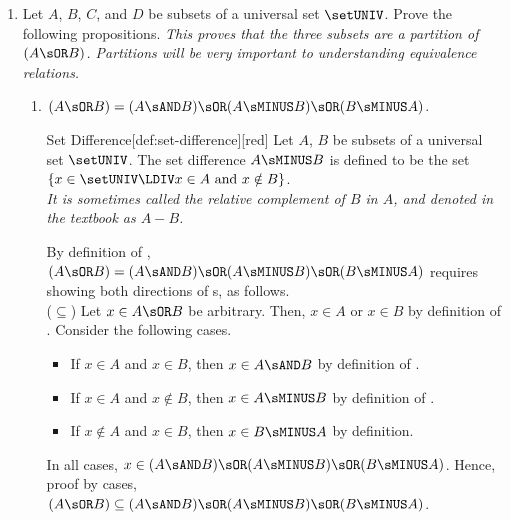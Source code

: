 \newpage
\begin{enumerate} 
  \newpage
  \item Let $A$, $B$, $C$, and $D$ be subsets of a universal set $\setUNIV$. 
  Prove the following propositions.
  \textit{This proves that the three subsets are a partition of 
  $(A \sOR B)$. Partitions will be very important to 
  understanding equivalence relations.}
  \begin{enumerate}
    \item $(A \sOR B)=(A \sAND B) \sOR(A \sMINUS B) \sOR(B \sMINUS A)$.\label{prob:partite-a}
    \begin{define}{Set Difference}[def:set-difference][red]
      Let $A$, $B$ be subsets of a universal set $\setUNIV$. The set difference $A \sMINUS B$ is defined to be the set $\{ x \in \setUNIV \LDIV x \in A \text{ and } x \notin B\}$. \vspace*{5px}\\
      \textit{It is sometimes called the relative complement of $B$ in $A$, and denoted in the textbook as $A - B$.}
    \end{define}
    \begin{subprove}
      By definition of , $(A \sOR B)=(A \sAND B) \sOR(A \sMINUS B) \sOR(B \sMINUS A)$ 
      requires showing both directions of s, as follows.\vspace*{5px}\\
      ($\subseteq$) Let $x \in A \sOR B$ be arbitrary. Then, $x \in A$ or $x \in B$ 
      by definition of . Consider the following cases.
      \begin{itemize}
        \item If $x \in A$ and $x \in B$, then $x \in A \sAND B$ by definition of .
        \item If $x \in A$ and $x \notin B$, then $x \in A \sMINUS B$ by definition of .
        \item If $x \notin A$ and $x \in B$, then $x \in B \sMINUS A$ by definition.
      \end{itemize}
      In all cases, $x \in (A \sAND B) \sOR(A \sMINUS B) \sOR(B \sMINUS A)$. 
      Hence, proof by cases, $(A \sOR B) \subseteq (A \sAND B) \sOR(A \sMINUS B) \sOR(B \sMINUS A)$.\vspace*{5px}\\

\end{subprove}
\end{enumerate}
\end{enumerate}
